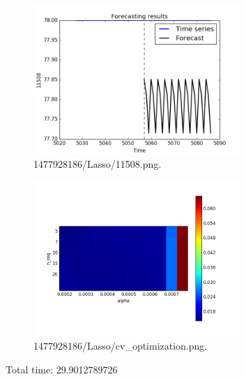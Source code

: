 \documentclass[12pt]{article}
\begin{document}
\begin{figure}
\includegraphics[width=0.7\textwidth]{1477928186/Lasso/11508.png}
\caption{1477928186/Lasso/11508.png.} \label{fg:1477928186/Lasso/11508.png}
\end{figure}

\begin{figure}
\includegraphics[width=0.7\textwidth]{1477928186/Lasso/cv_optimization.png}
\caption{1477928186/Lasso/cv\_optimization.png.} \label{fg:1477928186/Lasso/cv_optimization.png}
\end{figure}

 Total time: 29.9012789726
 \
\end{document}
